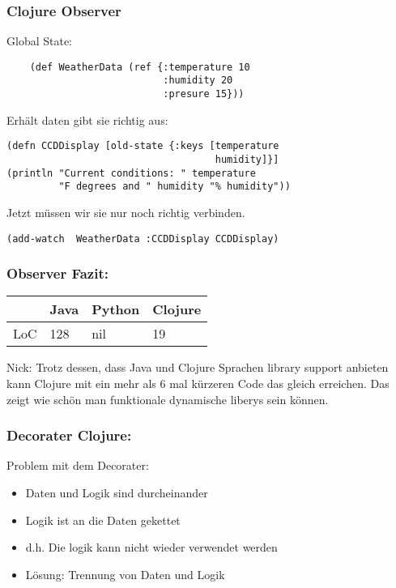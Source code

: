 \documentclass[compress, blue]{beamer}
\begin{document}
\begin{frame}[fragile]\frametitle{Clojure Observer}

Global State:
  \begin{lstlisting}
    (def WeatherData (ref {:temperature 10 
                           :humidity 20 
                           :presure 15}))
  \end{lstlisting}
\pause
Erhält daten gibt sie richtig aus:
\pause
\begin{lstlisting}
(defn CCDDisplay [old-state {:keys [temperature 
                                    humidity]}]
(println "Current conditions: " temperature 
         "F degrees and " humidity "% humidity"))
\end{lstlisting}
\pause
Jetzt müssen wir sie nur noch richtig verbinden.
\pause
\begin{lstlisting}
(add-watch  WeatherData :CCDDisplay CCDDisplay)
\end{lstlisting}
\end{frame}






\begin{frame}\frametitle{Observer Fazit:}
    \begin{tabular}{l | l l l}
     & Java &  Python & Clojure  \\
     \hline
    LoC & 128 &  nil & 19  \\
  \end{tabular}
  
  \begin{block}{Nick:}
    Trotz dessen, dass Java und Clojure Sprachen library support anbieten kann
    Clojure mit ein mehr als 6 mal kürzeren Code das gleich
    erreichen. Das zeigt wie schön man funktionale dynamische liberys
    sein können.
  \end{block}
\end{frame}



\begin{frame}\frametitle{Decorater Clojure:}

  \begin{block}{Problem mit dem Decorater:}
    \begin{itemize}
    \item Daten und Logik sind durcheinander
    \item Logik ist an die Daten gekettet
    \item d.h. Die logik kann nicht wieder verwendet werden
    \item Lösung: Trennung von Daten und Logik
    \end{itemize}
  \end{block}
\end{frame}
\end{document}
